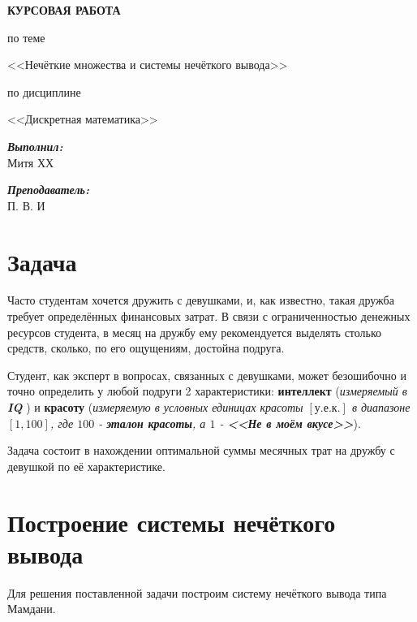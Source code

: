 \documentclass[12pt, a4paper]{article}
\begin{document}

\vspace*{0.25\textheight}
\begin{center}
\textbf{\LARGE КУРСОВАЯ РАБОТА}

\LARGE по теме

\LARGE <<Нечёткие множества и системы нечёткого вывода>>

\LARGE по дисциплине

\LARGE <<Дискретная математика>>\bigskip

\end{center}
\vspace*{5cm}
\begin{flushright}
\begin{minipage}{.2\linewidth}
\textit{\textbf{Выполнил:}}\\
Митя ХХ

\textit{\textbf{Преподаватель:}}\\
П. В. И
\end{minipage}
\end{flushright}


\thispagestyle{firstpage}
\newpage
\tableofcontents

\restoregeometry
\def\pcolor{peri}
\def\scolor{royal_blue}
\section{Задача}
Часто студентам хочется дружить с девушками, и, как известно, такая дружба требует определённых финансовых затрат. В связи с ограниченностью денежных ресурсов студента,  в месяц на дружбу ему рекомендуется выделять столько средств, сколько, по его ощущениям, достойна подруга. 

Студент, как эксперт в вопросах, связанных с девушками, может безошибочно и точно определить у любой подруги 2 характеристики: \textbf{интеллект} (\textit{измеряемый в \textbf{IQ} }) и \textbf{красоту} (\textit{измеряемую в условных единицах красоты $\left[ \text{у.е.к.} \right]$ в диапазоне $\left[1, 100 \right]$, где $100$ - \textbf{эталон красоты}, а $1$ - \textbf{<<Не в моём вкусе>>}}).

Задача состоит в нахождении оптимальной суммы месячных трат на дружбу с девушкой по её характеристике.


\section{Построение системы нечёткого вывода}
Для решения поставленной задачи построим систему нечёткого вывода типа Мамдани.
\end{document}
